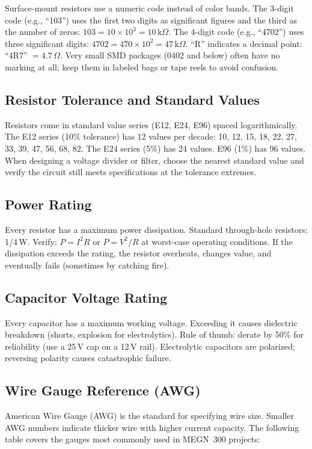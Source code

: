 \documentclass[11pt,letterpaper,twoside,openany]{book}
\begin{document}
\begin{tipbox}
Surface-mount resistors use a numeric code instead of color bands. The 3-digit code (e.g., ``103'') uses the first two digits as significant figures and the third as the number of zeros: $103 = 10 \times 10^3 = 10\,\text{k}\Omega$. The 4-digit code (e.g., ``4702'') uses three significant digits: $4702 = 470 \times 10^2 = 47\,\text{k}\Omega$. ``R'' indicates a decimal point: ``4R7'' $= 4.7\,\Omega$. Very small SMD packages (0402 and below) often have no marking at all; keep them in labeled bags or tape reels to avoid confusion.
\end{tipbox}

\subsection{Resistor Tolerance and Standard Values}
Resistors come in standard value series (E12, E24, E96) spaced logarithmically. The E12 series (10\% tolerance) has 12 values per decade: 10, 12, 15, 18, 22, 27, 33, 39, 47, 56, 68, 82. The E24 series (5\%) has 24 values. E96 (1\%) has 96 values. When designing a voltage divider or filter, choose the nearest standard value and verify the circuit still meets specifications at the tolerance extremes.

\subsection{Power Rating}
Every resistor has a maximum power dissipation. Standard through-hole resistors: 1/4\,W. Verify: $P = I^2R$ or $P = V^2/R$ at worst-case operating conditions. If the dissipation exceeds the rating, the resistor overheats, changes value, and eventually fails (sometimes by catching fire).

\subsection{Capacitor Voltage Rating}
Every capacitor has a maximum working voltage. Exceeding it causes dielectric breakdown (shorts, explosion for electrolytics). Rule of thumb: derate by 50\% for reliability (use a 25\,V cap on a 12\,V rail). Electrolytic capacitors are polarized; reversing polarity causes catastrophic failure.

\subsection{Wire Gauge Reference (AWG)}
American Wire Gauge (AWG) is the standard for specifying wire size. Smaller AWG numbers indicate thicker wire with higher current capacity. The following table covers the gauges most commonly used in MEGN~300 projects:
\end{document}
